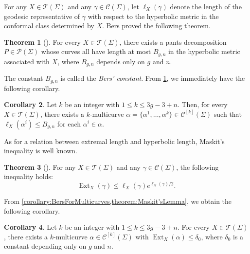 \documentclass[a4paper,11pt]{amsart}
\numberwithin{equation}{section}
\theoremstyle{definition}
\newtheorem{theorem}{Theorem}[section]
\newtheorem{corollary}[theorem]{Corollary}
\newcommand{\Teich}{\mathcal{T}}
\DeclareMathOperator{\Ext}{Ext}
\newcommand{\multicurve}[1]{\mathcal{C}^{[#1]}}
\begin{document}
For any $X \in \Teich(\Sigma)$ and any $\gamma \in \mathcal{C}(\Sigma)$, let $\ell_X(\gamma)$ denote the length of the geodesic representative of $\gamma$ with respect to the hyperbolic metric in the conformal class determined by $X$.
Bers proved the following theorem.

\begin{theorem}[\cite{bers1985inequality}]\label{theorem:BersConstant}
    For every $X \in \Teich(\Sigma)$, there exists a pants decomposition $P \in \mathcal{P}(\Sigma)$ whose curves all have length at most $B_{g,n}$ in the hyperbolic metric associated with $X$, where $B_{g,n}$ depends only on $g$ and $n$.
\end{theorem}

The constant $B_{g,n}$ is called the \textit{Bers' constant}.
From \cref{theorem:BersConstant}, we immediately have the following corollary.

\begin{corollary}\label{corollary:BersForMulticurves}
    Let $k$ be an integer with $1 \le k \le 3g-3+n$.
    Then, for every $X \in \Teich(\Sigma)$, there exists a $k$-multicurve $\alpha = \{\alpha^1,\ldots,\alpha^k\} \in \multicurve{k}(\Sigma)$ such that $\ell_X(\alpha^i) \le B_{g,n}$ for each $\alpha^i \in \alpha$.
\end{corollary} 

As for a relation between extremal length and hyperbolic length, Maskit's inequality is well known.

\begin{theorem}[\cite{maskit1985comparison}]\label{theorem:Maskit'sLemma}
    For any $X \in \Teich(\Sigma)$ and any $\gamma \in \mathcal{C}(\Sigma)$, the    following inequality holds:
    \begin{equation*}
        \Ext_X(\gamma) \le \ell_X(\gamma)e^{\ell_X(\gamma)/2}.
    \end{equation*}
\end{theorem}

From \cref{corollary:BersForMulticurves,theorem:Maskit'sLemma}, we obtain the following corollary.

\begin{corollary}\label{corollary:UniformBoundForExtremalLength}
    Let $k$ be an integer with $1\leq k\leq 3g-3+n$.
    For every $X\in \Teich(\Sigma)$, there exists a $k$-multicurve $\alpha\in\multicurve{k}(\Sigma)$ with $\Ext_X(\alpha)\leq \delta_0$,
    where $\delta_0$ is a constant depending only on $g$ and $n$.
\end{corollary}
\end{document}
